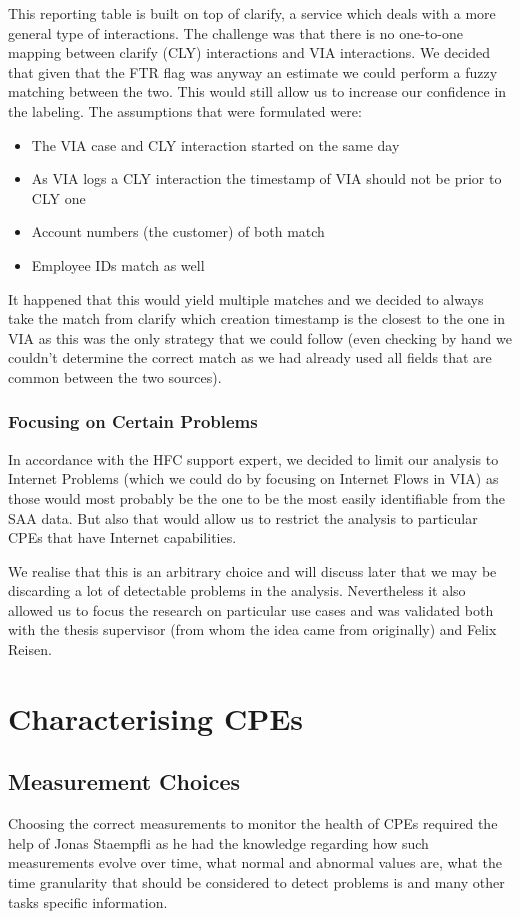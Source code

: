 This reporting table is built on top of clarify, a service which deals with a more general type of interactions. The challenge was that there is no one-to-one mapping between clarify (CLY) interactions and VIA interactions. We decided that given that the FTR flag was anyway an estimate we could perform a fuzzy matching between the two. This would still allow us to increase our confidence in the labeling. The assumptions that were formulated were:
\begin{itemize}[topsep=0pt,noitemsep]
	\item The VIA case and CLY interaction started on the same day
	\item As VIA logs a CLY interaction the timestamp of VIA should not be prior to CLY one
	\item Account numbers (the customer) of both match
	\item Employee IDs match as well
\end{itemize}
It happened that this would yield multiple matches and we decided to always take the match from clarify which creation timestamp is the closest to the one in VIA as this was the only strategy that we could follow (even checking by hand we couldn't determine the correct match as we had already used all fields that are common between the two sources). 

\subsubsection{Focusing on Certain Problems}
In accordance with the HFC support expert, we decided to limit our analysis to Internet Problems (which we could do by focusing on Internet Flows in VIA) as those would most probably be the one to be the most easily identifiable from the SAA data. But also that would allow us to restrict the analysis to particular CPEs that have Internet capabilities. 

We realise that this is an arbitrary choice and will discuss later that we may be discarding a lot of detectable problems in the analysis. Nevertheless it also allowed us to focus the research on particular use cases and was validated both with the thesis supervisor (from whom the idea came from originally) and Felix Reisen. 

\section{Characterising CPEs}
\subsection{Measurement Choices}
\label{subsec:mes_choices}
Choosing the correct measurements to monitor the health of CPEs required the help of Jonas Staempfli as he had the knowledge regarding how such measurements evolve over time, what normal and abnormal values are, what the time granularity that should be considered to detect problems is and many other tasks specific information. 


